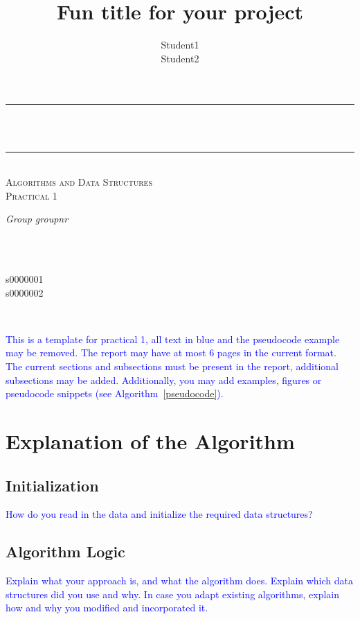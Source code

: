 \documentclass[a4paper]{article}
\title{Fun title for your project}
\author{Student1 \\ Student2}
\makeatletter
\newcommand{\instruction}[1]{\textcolor{blue}{#1}}
\let\thetitle\@title
\let\theauthor\@author
\makeatother
\begin{document}
\begin{center}
\rule{\linewidth}{0.2 mm} \\[0.4 cm]
{ \huge \bfseries \thetitle}\\
\rule{\linewidth}{0.2 mm} \\[0.5 cm]
\textsc{\Large Algorithms and Data Structures}\\[0.2 cm]				
\textsc{\large Practical 1}\\[0.5 cm]				

\begin{minipage}{0.4\textwidth}
    \begin{flushleft} \large
        \emph{Group groupnr}\\
        \theauthor
        \end{flushleft}
        \end{minipage}~
        \begin{minipage}{0.4\textwidth}
        \begin{flushright} \large
        ~\\
        s0000001\\	s0000002
    \end{flushright}
\end{minipage}\\[1 cm]
\end{center}

\noindent\instruction{This is a template for practical 1, all text in blue and the pseudocode example may be removed. The report may have at most 6 pages in the current format. The current sections and subsections must be present in the report, additional subsections may be added. Additionally, you may add examples, figures or pseudocode snippets (see Algorithm~\ref{pseudocode}).}


\section{Explanation of the Algorithm}
\subsection{Initialization}
\instruction{How do you read in the data and initialize the required data structures?}

\subsection{Algorithm Logic}
\instruction{Explain what your approach is, and what the algorithm does. Explain which data structures did you use and why. In case you adapt existing algorithms, explain how and why you modified and incorporated it.}
\end{document}
